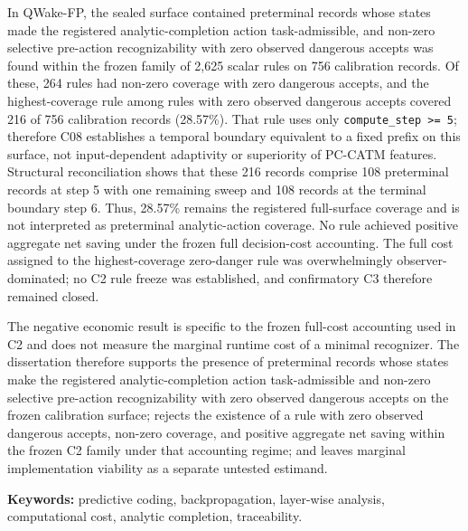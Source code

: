 In QWake-FP, the sealed surface contained preterminal records whose states made the
registered analytic-completion action task-admissible, and non-zero selective
pre-action recognizability with zero observed dangerous accepts was found within the
frozen family of 2,625 scalar rules on 756 calibration records. Of these, 264 rules
had non-zero coverage with zero dangerous accepts, and the highest-coverage rule
among rules with zero observed dangerous accepts covered 216 of 756 calibration
records (28.57\%). That rule uses only \texttt{compute\_step >= 5}; therefore C08
establishes a temporal boundary equivalent to a fixed prefix on this surface, not
input-dependent adaptivity or superiority of PC-CATM features. Structural
reconciliation shows that these 216 records comprise 108 preterminal records at
step 5 with one remaining sweep and 108 records at the terminal boundary step 6.
Thus, 28.57\% remains the registered full-surface coverage and is not interpreted
as preterminal analytic-action coverage. No rule achieved positive aggregate net
saving under the frozen full decision-cost accounting. The full cost assigned to
the highest-coverage zero-danger rule was overwhelmingly observer-dominated; no C2
rule freeze was established, and confirmatory C3 therefore remained closed.

The negative economic result is specific to the frozen full-cost accounting used in
C2 and does not measure the marginal runtime cost of a minimal recognizer. The
dissertation therefore supports the presence of preterminal records whose states
make the registered analytic-completion action task-admissible and non-zero selective
pre-action recognizability with zero observed dangerous accepts on the frozen
calibration surface; rejects the existence of a rule with zero observed dangerous accepts,
non-zero coverage, and positive aggregate net saving within the frozen C2 family under
that accounting regime; and leaves marginal implementation viability as a separate
untested estimand.

\noindent\textbf{Keywords:} predictive coding, backpropagation, layer-wise analysis,
computational cost, analytic completion, traceability.
